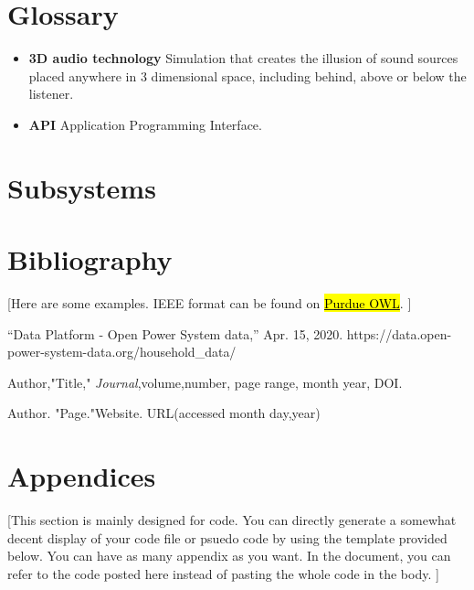 \documentclass[letterpaper, 11pt]{article}
\begin{document}
\clearpage
\section*{Glossary} %
\begin{itemize} %
    \item \textbf{3D audio technology} Simulation that creates
          the illusion of sound sources placed anywhere in 3
          dimensional space, including behind, above or below the listener.
    \item \textbf{API} Application Programming Interface.
\end{itemize}





\clearpage
\section{Subsystems}








\clearpage
\section{Bibliography}

 [Here are some examples. IEEE format can be found on \href{https://owl.purdue.edu/owl/research_and_citation/ieee_style/ieee_overview.html}{\hl{Purdue OWL}}. ]

\begin{thebibliography}{}

    “Data Platform - Open Power System data,” Apr. 15, 2020. https://data.open-power-system-data.org/household\_data/

    Author,"Title," \emph{Journal},volume,number, page range, month year, DOI.

    Author. "Page."Website. URL(accessed month day,year)

\end{thebibliography}

\clearpage
\section{Appendices}
 [This section is mainly designed for code. You can directly generate a somewhat decent display of your code file or psuedo code by using the template provided below. You can have as many appendix as you want. In the document, you can refer to the code posted here instead of pasting the whole code in the body. ]
\end{document}
